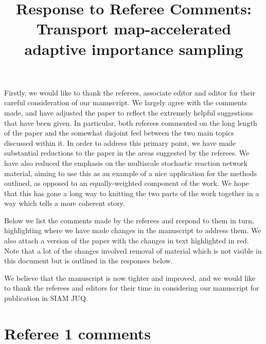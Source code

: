 \documentclass{article}
\begin{document}
\title{Response to Referee Comments: Transport map-accelerated adaptive importance sampling}
\maketitle

Firstly, we would like to thank the referees, associate editor and editor for their careful consideration of our manuscript. We largely agree with the comments made, and have adjusted the paper to reflect the extremely helpful suggestions that have been given. In particular, both referees commented on the long length of the paper and the somewhat disjoint feel between the two main topics discussed within it. In order to address this primary point, we have made substantial reductions to the paper in the areas suggested by the referees. We have also reduced the emphasis on the multiscale stochastic reaction network material, aiming to use this as an example of a nice application for the methods outlined, as opposed to an equally-weighted component of the work. We hope that this has gone a long way to knitting the two parts of the work together in a way which tells a more coherent story.

Below we list the comments made by the referees and respond to them in turn, highlighting where we have made changes in the manuscript to address them. We also attach a version of the paper with the changes in text highlighted in red. Note that a lot of the changes involved removal of material which is not visible in this document but is outlined in the responses below.

We believe that the manuscript is now tighter and improved, and we would like to thank the referees and editors for their time in considering our manuscript for publication in SIAM JUQ.


\section*{Referee 1 comments}
\end{document}
